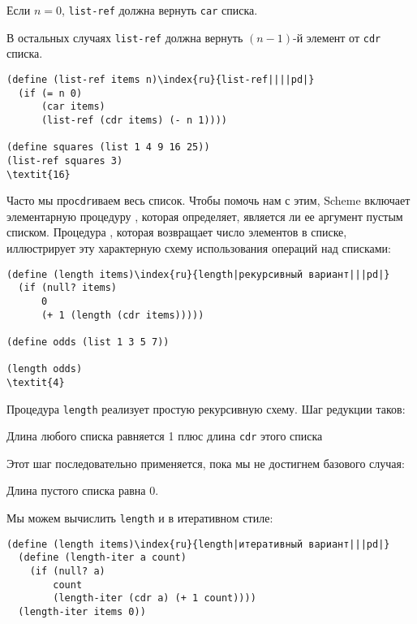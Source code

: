 \begin{plainlist}
\item
  Если $n = 0$, {\tt list-ref} должна 
  вернуть {\tt car} списка.

\item
  В остальных случаях {\tt list-ref} должна
  вернуть $(n - 1)$-й элемент от {\tt cdr} списка.
\end{plainlist}

\begin{Verbatim}[fontsize=\small]
(define (list-ref items n)\index{ru}{list-ref||||pd|}
  (if (= n 0)
      (car items)
      (list-ref (cdr items) (- n 1))))

(define squares (list 1 4 9 16 25))
(list-ref squares 3)
\textit{16}
\end{Verbatim}
Часто мы про{\tt cdr}иваем весь список.  Чтобы помочь нам с
этим, Scheme включает элементарную процедуру 
,
которая определяет, является ли ее аргумент пустым списком.  
Процедура  ,
которая возвращает число элементов в списке,
иллюстрирует эту характерную схему использования операций над списками:

\begin{Verbatim}[fontsize=\small]
(define (length items)\index{ru}{length|рекурсивный вариант|||pd|}
  (if (null? items)
      0
      (+ 1 (length (cdr items)))))

(define odds (list 1 3 5 7))

(length odds)
\textit{4}
\end{Verbatim}
Процедура {\tt length} реализует простую рекурсивную схему. Шаг
редукции таков:

\begin{plainlist}

\item
Длина любого списка равняется 1 плюс длина
{\tt cdr} этого списка
\end{plainlist}
Этот шаг последовательно применяется, пока мы не достигнем базового
случая:

\begin{plainlist}
\item
Длина пустого списка равна 0.
\end{plainlist}
Мы можем вычислить {\tt length} и в итеративном стиле:

\begin{Verbatim}[fontsize=\small]
(define (length items)\index{ru}{length|итеративный вариант|||pd|}
  (define (length-iter a count)
    (if (null? a)
        count
        (length-iter (cdr a) (+ 1 count))))
  (length-iter items 0))
\end{Verbatim}

